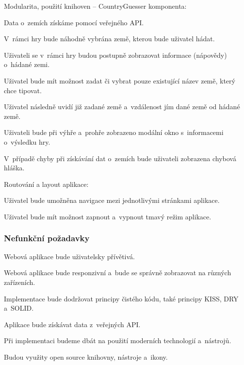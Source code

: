 \begin{citemize}
	\item Modularita, použití knihoven -- CountryGuesser komponenta:
	
	\begin{cenumerate}
		\item Data o~zemích získáme pomocí veřejného API.
		\item V~rámci hry bude náhodně vybrána země, kterou bude uživatel hádat.
		\item Uživateli se v~rámci hry budou postupně zobrazovat informace (nápovědy) o~hádané zemi.
		\item Uživatel bude mít možnost zadat či vybrat pouze existující název země, který chce tipovat.
		\item Uživatel následně uvidí již zadané země a~vzdálenost jím dané země od hádané země.
		\item Uživateli bude při výhře a~prohře zobrazeno modální okno s~informacemi o~výsledku hry.
		\item V~případě chyby při získávání dat o~zemích bude uživateli zobrazena chybová hláška.
	\end{cenumerate}

	\item Routování a layout aplikace:
	
	\begin{cenumerate}
		\item Uživatel bude umožněna navigace mezi jednotlivými stránkami aplikace.
		\item Uživatel bude mít možnost zapnout a~vypnout tmavý režim aplikace.
	\end{cenumerate}
\end{citemize}

\subsubsection{Nefunkční požadavky}

\begin{citemize}
	\item Webová aplikace bude uživatelsky přívětivá.
	\item Webová aplikace bude responzivní a~bude se správně zobrazovat na různých zařízeních.
	\item Implementace bude dodržovat principy čistého kódu, také principy KISS, DRY a~SOLID.
	\item Aplikace bude získávat data z~veřejných API.
	\item Při implementaci budeme dbát na použití moderních technologií a~nástrojů.
	\item Budou využity open source knihovny, nástroje a~ikony. 
\end{citemize}

